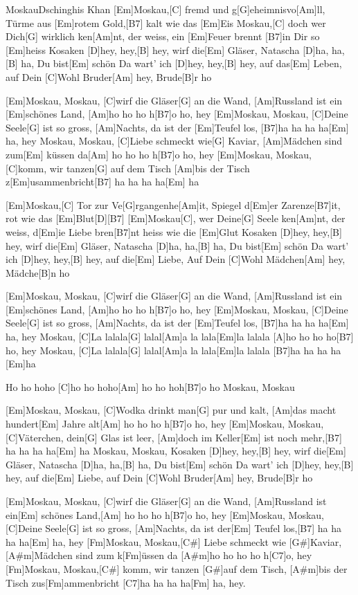 \documentclass[../main.tex]{subfiles}
\begin{document}
\begin{song}[1]{Moskau}{Dschinghis Khan}{}
[Em]Moskau,[C] fremd und g[G]eheimnisvo[Am]ll, Türme aus [Em]rotem Gold,[B7] kalt wie das [Em]Eis
Moskau,[C] doch wer Dich[G] wirklich ken[Am]nt, der weiss, ein [Em]Feuer brennt [B7]in Dir so [Em]heiss
Kosaken [D]hey, hey,[B] hey, wirf die[Em] Gläser, Natascha [D]ha, ha,[B] ha, Du bist[Em] schön
Da wart' ich [D]hey, hey,[B] hey, auf das[Em] Leben, auf Dein [C]Wohl Bruder[Am] hey, Brude[B]r ho

[Em]Moskau, Moskau, [C]wirf die Gläser[G] an die Wand, [Am]Russland ist ein [Em]schönes Land, [Am]ho ho ho h[B7]o ho, hey
[Em]Moskau, Moskau, [C]Deine Seele[G] ist so gross, [Am]Nachts, da ist der [Em]Teufel los, [B7]ha ha ha ha[Em] ha, hey
Moskau, Moskau, [C]Liebe schmeckt wie[G] Kaviar, [Am]Mädchen sind zum[Em] küssen da[Am] ho ho ho h[B7]o ho, hey
[Em]Moskau, Moskau, [C]komm, wir tanzen[G] auf dem Tisch [Am]bis der Tisch z[Em]usammenbricht[B7] ha ha ha ha[Em] ha

[Em]Moskau,[C] Tor zur Ve[G]rgangenhe[Am]it, Spiegel d[Em]er Zarenze[B7]it, rot wie das [Em]Blut[D]{\hh}[B7]{\hh}
[Em]Moskau[C], wer Deine[G] Seele ken[Am]nt, der weiss, d[Em]ie Liebe bren[B7]nt heiss wie die [Em]Glut
Kosaken [D]hey, hey,[B] hey, wirf die[Em] Gläser, Natascha [D]ha, ha,[B] ha, Du bist[Em] schön
Da wart' ich [D]hey, hey,[B] hey, auf die[Em] Liebe, Auf Dein [C]Wohl Mädchen[Am] hey, Mädche[B]n ho

[Em]Moskau, Moskau, [C]wirf die Gläser[G] an die Wand, [Am]Russland ist ein [Em]schönes Land, [Am]ho ho ho h[B7]o ho, hey
[Em]Moskau, Moskau, [C]Deine Seele[G] ist so gross, [Am]Nachts, da ist der [Em]Teufel los, [B7]ha ha ha ha[Em] ha, hey
Moskau, [C]La lalala[G] lalal[Am]a la lala[Em]la lalala [A]ho ho ho ho[B7] ho, hey
Moskau, [C]La lalala[G] lalal[Am]a la lala[Em]la lalala [B7]ha ha ha ha [Em]ha

Ho ho hoho [C]ho ho hoho[Am] ho ho hoh[B7]o ho Moskau, Moskau

[Em]Moskau, Moskau, [C]Wodka drinkt man[G] pur und kalt, [Am]das macht hundert[Em] Jahre alt[Am] ho ho ho h[B7]o ho, hey
[Em]Moskau, Moskau, [C]Väterchen, dein[G] Glas ist leer, [Am]doch im Keller[Em] ist noch mehr,[B7] ha ha ha ha[Em] ha
Moskau, Moskau, Kosaken [D]hey, hey,[B] hey, wirf die[Em] Gläser, Natascha [D]ha, ha,[B] ha, Du bist[Em] schön
Da wart' ich [D]hey, hey,[B] hey, auf die[Em] Liebe, auf Dein [C]Wohl Bruder[Am] hey, Brude[B]r ho

[Em]Moskau, Moskau, [C]wirf die Gläser[G] an die Wand, [Am]Russland ist ein[Em] schönes Land,[Am] ho ho ho h[B7]o ho, hey
[Em]Moskau, Moskau, [C]Deine Seele[G] ist so gross, [Am]Nachts, da ist der[Em] Teufel los,[B7] ha ha ha ha[Em] ha, hey
[Fm]Moskau, Moskau,[C#] Liebe schmeckt wie [G#]Kaviar, [A#m]Mädchen sind zum k[Fm]{ü}ssen da [A#m]ho ho ho ho h[C7]o, hey
[Fm]Moskau, Moskau,[C#] komm, wir tanzen [G#]auf dem Tisch, [A#m]bis der Tisch zus[Fm]ammenbricht [C7]ha ha ha ha[Fm] ha, hey.

\end{song}
\end{document}
